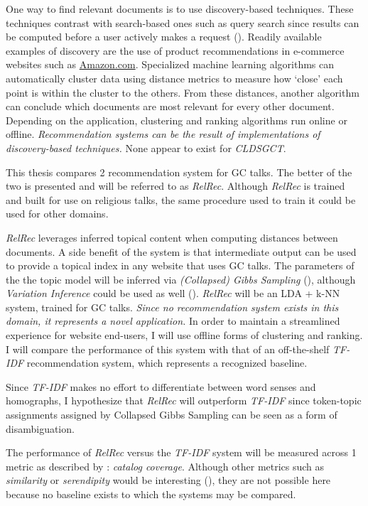 One way to find relevant documents is to use discovery-based techniques. These techniques contrast with search-based ones such as query search since results can be computed before a user actively makes a request (\citealp{todo}). Readily available examples of discovery are the use of product recommendations in e-commerce websites such as \url{Amazon.com}. Specialized machine learning algorithms can automatically cluster data using distance metrics to measure how `close' each point is within the cluster to the others. From these distances, another algorithm can conclude which documents are most relevant for every other document. Depending on the application, clustering and ranking algorithms run online or offline. \textit{Recommendation systems can be the result of implementations of discovery-based techniques.} None appear to exist for \emph{CLDSGCT}.

This thesis compares 2 recommendation system for GC talks. The better of the two is presented and will be referred to as \emph{RelRec}. Although \emph{RelRec} is trained and built for use on religious talks, the same procedure used to train it could be used for other domains.

\emph{RelRec} leverages inferred topical content when computing distances between documents. A side benefit of the system is that intermediate output can be used to provide a topical index in any website that uses GC talks. The parameters of the the topic model will be inferred via \emph{(Collapsed) Gibbs Sampling} (\citealp{Porteous:2008:FCG:1401890.1401960}), although \emph{Variation Inference} could be used as well (\citealp{blei2006variational}). \emph{RelRec} will be an LDA + k-NN system, trained for GC talks. \textit{Since no recommendation system exists in this domain, it represents a novel application.} In order to maintain a streamlined experience for website end-users, I will use offline forms of clustering and ranking. I will compare the performance of this system with that of an off-the-shelf \emph{TF-IDF} recommendation system, which represents a recognized baseline.

Since \emph{TF-IDF} makes no effort to differentiate between word senses and homographs, I hypothesize that \emph{RelRec} will outperform \emph{TF-IDF} since token-topic assignments assigned by Collapsed Gibbs Sampling can be seen as a form of disambiguation.

The performance of \emph{RelRec} versus the \emph{TF-IDF} system will be measured across 1 metric as described by \cite{Ge:2010:BAE:1864708.1864761}: \emph{catalog coverage}. Although other metrics such as \emph{similarity} or \emph{serendipity} would be interesting (\citealp{Ge:2010:BAE:1864708.1864761}), they are not possible here because no baseline exists to which the systems may be compared. %


